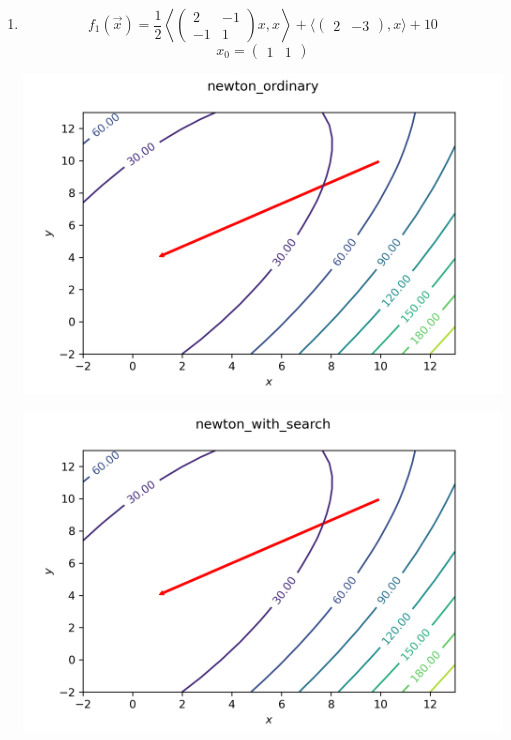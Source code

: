 \documentclass[english]{article}
\begin{document}
\begin{enumerate}
\item
  \[ f_1(\vec{x}) = \frac{1}{2} \left\langle \begin{pmatrix} 2 & -1 \\ -1 & 1 \end{pmatrix} x, x \right\rangle + \langle \begin{pmatrix} 2 & -3 \end{pmatrix} , x \rangle + 10 \]
  \[ x_0 = \begin{pmatrix}
    1 & 1
    \end{pmatrix} \]
  \begin{center}
    \includegraphics[scale=0.7]{plots/contours_newton_ordinary_1.png}
  \end{center}
  \begin{center}
    \includegraphics[scale=0.7]{plots/contours_newton_with_search_1.png}

\end{center}
\end{enumerate}
\end{document}
